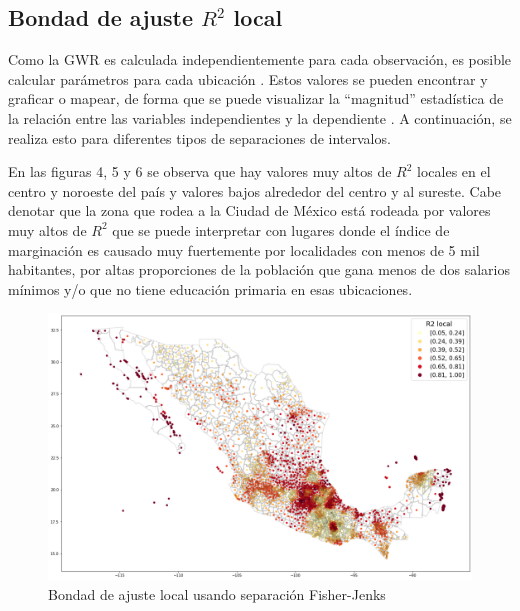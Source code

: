 \documentclass[12pt,letterpaper]{article}
\begin{document}
\subsection{Bondad de ajuste $R^2$ local}

Como la GWR es calculada independientemente para cada observación, es posible calcular parámetros para cada ubicación \cite{c}. Estos valores se pueden encontrar y graficar o mapear, de forma que se puede visualizar la “magnitud” estadística de la relación entre las variables independientes y la dependiente \cite{c}. A continuación, se realiza esto para diferentes tipos de separaciones de intervalos. 

En las figuras 4, 5 y 6 se observa que hay valores muy altos de $R^2$ locales en el centro y noroeste del país y valores bajos alrededor del centro y al sureste. Cabe denotar que la zona que rodea a la Ciudad de México está rodeada por valores muy altos de $R^2$ que se puede interpretar con lugares donde el índice de marginación es causado muy fuertemente por localidades con menos de 5 mil habitantes, por altas proporciones de la población que gana menos de dos salarios mínimos y/o que no tiene educación primaria en esas ubicaciones. 



\begin{figure}[H]
	\centering
	\includegraphics[scale=0.4]{output_17_1.png}
	\caption{Bondad de ajuste local usando separación Fisher-Jenks}
\end{figure}
\end{document}
